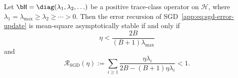 \begin{theorem}
\label{app:thm:sgd-stability}
Let $\bH=\diag(\lambda_1,\lambda_2,\ldots)$ be a positive
trace-class operator on $\mathcal H$, where
\(
\lambda_1=\lambda_{\max}
\geq\lambda_2\geq\cdots>0.
\)
Then the error recursion of SGD~\eqref{app:eq:sgd-error-update} is mean-square asymptotically stable if and only if
\begin{equation}
\label{app:eq:sgd-local-condition}
\eta
<
\frac{2B}{(B+1)\lambda_{\max}}
\end{equation}
and
\begin{equation}
\label{app:eq:sgd-global-condition}
\mathcal R_{\mathrm{SGD}}(\eta)
:=
\sum_{i\geq1}
\frac{\eta\lambda_i}
{2B-(B+1)\eta\lambda_i}
<1.
\end{equation}
\end{theorem}

